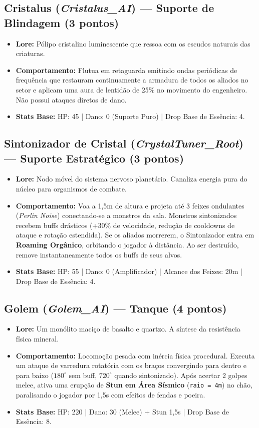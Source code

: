 \documentclass[a4paper,12pt]{report}
\begin{document}
\subsection{Cristalus (\textit{Cristalus\_AI}) --- Suporte de Blindagem (3 pontos)}
\begin{itemize}
    \item \textbf{Lore:} Pólipo cristalino luminescente que ressoa com os escudos naturais das criaturas.
    \item \textbf{Comportamento:} Flutua em retaguarda emitindo ondas periódicas de frequência que restauram continuamente a armadura de todos os aliados no setor e aplicam uma aura de lentidão de 25\% no movimento do engenheiro. Não possui ataques diretos de dano.
    \item \textbf{Stats Base:} HP: 45 | Dano: 0 (Suporte Puro) | Drop Base de Essência: 4.
\end{itemize}

\subsection{Sintonizador de Cristal (\textit{CrystalTuner\_Root}) --- Suporte Estratégico (3 pontos)}
\begin{itemize}
    \item \textbf{Lore:} Nodo móvel do sistema nervoso planetário. Canaliza energia pura do núcleo para organismos de combate.
    \item \textbf{Comportamento:} Voa a 1,5m de altura e projeta até 3 feixes ondulantes (\textit{Perlin Noise}) conectando-se a monstros da sala. Monstros sintonizados recebem buffs drásticos (+30\% de velocidade, redução de cooldowns de ataque e rotação estendida). Se os aliados morrerem, o Sintonizador entra em \textbf{Roaming Orgânico}, orbitando o jogador à distância. Ao ser destruído, remove instantaneamente todos os buffs de seus alvos.
    \item \textbf{Stats Base:} HP: 55 | Dano: 0 (Amplificador) | Alcance dos Feixes: 20m | Drop Base de Essência: 4.
\end{itemize}

\subsection{Golem (\textit{Golem\_AI}) --- Tanque (4 pontos)}
\begin{itemize}
    \item \textbf{Lore:} Um monólito maciço de basalto e quartzo. A síntese da resistência física mineral.
    \item \textbf{Comportamento:} Locomoção pesada com inércia física procedural. Executa um ataque de varredura rotatória com os braços convergindo para dentro e para baixo ($180^\circ$ sem buff, $720^\circ$ quando sintonizado). Após acertar 2 golpes melee, ativa uma erupção de \textbf{Stun em Área Sísmico} (\texttt{raio = 4m}) no chão, paralisando o jogador por 1,5s com efeitos de fendas e poeira.
    \item \textbf{Stats Base:} HP: 220 | Dano: 30 (Melee) + Stun 1,5s | Drop Base de Essência: 8.
\end{itemize}
\end{document}
